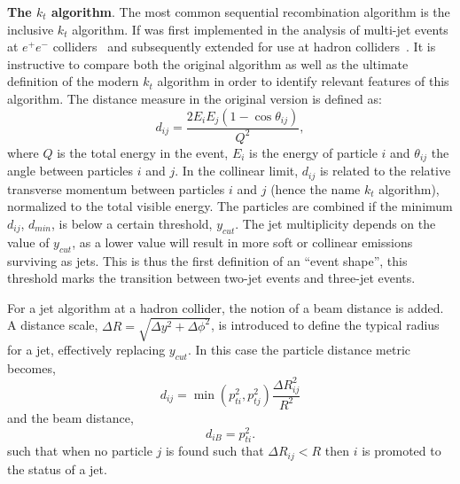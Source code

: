 \vspace{0.5cm}
\textbf{The $k_t$ algorithm}. The most common sequential recombination algorithm is the inclusive $k_t$ algorithm.  If was first implemented in the analysis of multi-jet events at $e^+ e^-$ colliders~\cite{JADE} and subsequently extended for use at hadron colliders~\cite{kt2,kt1}. 
It is instructive to compare both the original algorithm as well as the ultimate definition of the modern $k_t$ algorithm in order to identify relevant features of this algorithm.
The distance measure in the original  version is defined as: %
\begin{equation} 
d_{ij} = \frac{2E_i E_j (1- \cos \theta_{ij}) }{Q^2},
\label{eqn:origkt}
\end{equation}
where $Q$ is the total energy in the event, $E_i$ is the energy of particle $i$ and $\theta_{ij}$ the angle between particles $i$ and $j$. In the collinear limit, $d_{ij}$ is related to the relative transverse momentum between particles $i$ and $j$ (hence the name $k_t$ algorithm), normalized to the total visible energy.
The particles are combined if the minimum $d_{ij}$, $d_{min}$, is below a certain threshold, $y_{cut}$.  The jet multiplicity depends on the value of $y_{cut}$, as a lower value will result in more soft or collinear emissions surviving as jets. This is thus the first definition of an ``event shape'', this threshold marks the transition between two-jet events and three-jet events.

For a jet algorithm at a hadron collider, the notion of a beam distance is added. %
A distance scale, $\Delta R = \sqrt{\Delta y^2 +\Delta \phi^2}$, is introduced to define the typical radius for a jet, effectively replacing $y_{cut}$. In this case the particle distance metric becomes, %
%
\begin{equation} 
d_{ij} = \min(p^2_{ti},p^2_{tj}) \frac{\Delta R^2_{ij}}{R^2}
\label{eqn:kt}
\end{equation}
%
and the beam distance, 
%
\begin{equation}
d_{iB}=p^2_{ti}. 
\end{equation}
%
such that when no particle $j$ is found such that $\Delta R_{ij} < R$ then $i$ is promoted to the status of a jet.  

